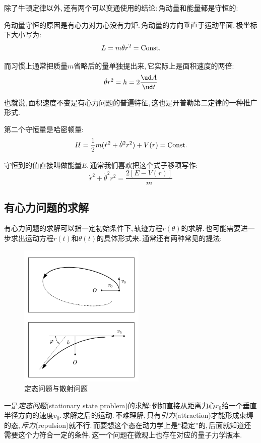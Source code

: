 除了牛顿定律以外,\,还有两个可以变通使用的结论:\,角动量和能量都是守恒的:

角动量守恒的原因是有心力对力心没有力矩.\,角动量的方向垂直于运动平面.\,极坐标下大小写为:
\[L=m\dot{\theta}r^2={\rm Const.}\]

而习惯上通常把质量$m$省略后的量单独提出来,\,它实际上是面积速度的两倍:
\[\dot{\theta}r^2=h=2\frac{\ud A}{\ud t}\]

也就说,\,面积速度不变是有心力问题的普遍特征,\,这也是开普勒第二定律的一种推广形式.

第二个守恒量是哈密顿量:
\[H=\frac{1}{2}m(\dot{r}^2+\dot{\theta}^2r^2)+V(r)={\rm Const.}\]

守恒到的值直接叫做能量$E$.\,通常我们喜欢把这个式子移项写作:
\[\dot{r}^2+\dot{\theta}^2r^2=\frac{2[E-V(r)]}{m}\]

\subsection{有心力问题的求解}

有心力问题的求解可以指一定初始条件下,\,轨迹方程$r(\theta)$的求解.\,也可能需要进一步求出运动方程$r(t)$和$\theta(t)$的具体形式来.\,通常还有两种常见的提法:

\begin{figure}
\centering
\vspace{-0.5cm}
\includegraphics[width=6cm]{image/6-5-1.png}
\caption{定态问题与散射问题}
\end{figure}
一是\emph{定态问题}(stationary state problem)的求解:\,例如直接从距离力心$r_0$给一个垂直半径方向的速度$v_0$.\,求解之后的运动.\,不难理解,\,只有\emph{引力}(attraction)才能形成束缚的态,\,\emph{斥力}(repulsion)就不行.\,而要想这个态在动力学上是``稳定''的,\,后面就知道还需要这个力符合一定的条件.\,这一个问题在微观上也存在对应的量子力学版本.

